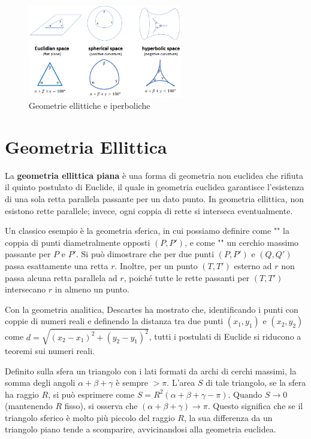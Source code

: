 \begin{figure}[H]
    \centering
    \includegraphics[width=0.6\textwidth]{assets/geometries.png}
    \caption{Geometrie ellittiche e iperboliche}
\end{figure}

\section{Geometria Ellittica}

La \textbf{geometria ellittica piana} è una forma di geometria non euclidea che rifiuta il quinto postulato di Euclide, il quale in geometria euclidea garantisce l'esistenza di una sola retta parallela passante per un dato punto. In geometria ellittica, non esistono rette parallele; invece, ogni coppia di rette si interseca eventualmente.

Un classico esempio è la geometria sferica, in cui possiamo definire come "" la coppia di punti diametralmente opposti $(P, P')$, e come "" un cerchio massimo passante per $P$ e $P'$. Si può dimostrare che per due punti $(P, P')$ e $(Q, Q')$ passa esattamente una retta $r$. Inoltre, per un punto $(T, T')$ esterno ad $r$ non passa alcuna retta parallela ad $r$, poiché tutte le rette passanti per $(T, T')$ intersecano $r$ in almeno un punto.

Con la geometria analitica, Descartes ha mostrato che, identificando i punti con coppie di numeri reali e definendo la distanza tra due punti $(x_1, y_1)$ e $(x_2, y_2)$ come $d = \sqrt{(x_2 - x_1)^2 + (y_2 - y_1)^2}$, tutti i postulati di Euclide si riducono a teoremi sui numeri reali.

Definito sulla sfera un triangolo con i lati formati da archi di cerchi massimi, la somma degli angoli $\alpha + \beta + \gamma$ è sempre $> \pi$. L'area $S$ di tale triangolo, se la sfera ha raggio $R$, si può esprimere come $S = R^2(\alpha + \beta + \gamma - \pi)$. Quando $S \to 0$ (mantenendo $R$ fisso), si osserva che $(\alpha + \beta + \gamma) \to \pi$. Questo significa che se il triangolo sferico è molto più piccolo del raggio $R$, la sua differenza da un triangolo piano tende a scomparire, avvicinandosi alla geometria euclidea.

